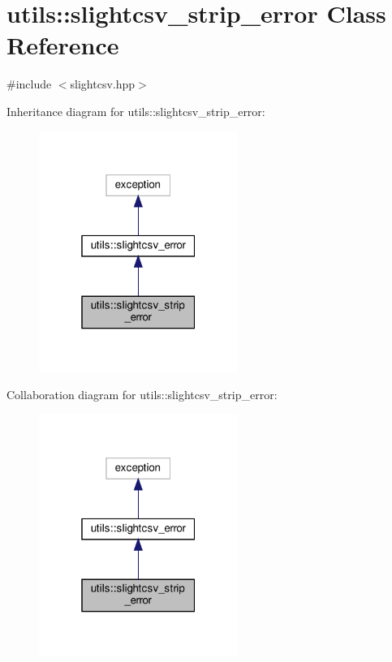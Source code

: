 \hypertarget{classutils_1_1slightcsv__strip__error}{}\section{utils\+:\+:slightcsv\+\_\+strip\+\_\+error Class Reference}
\label{classutils_1_1slightcsv__strip__error}


{\ttfamily \#include $<$slightcsv.\+hpp$>$}



Inheritance diagram for utils\+:\+:slightcsv\+\_\+strip\+\_\+error\+:
\nopagebreak
\begin{figure}[H]
\begin{center}
\leavevmode
\includegraphics[width=184pt]{classutils_1_1slightcsv__strip__error__inherit__graph}
\end{center}
\end{figure}


Collaboration diagram for utils\+:\+:slightcsv\+\_\+strip\+\_\+error\+:
\nopagebreak
\begin{figure}[H]
\begin{center}
\leavevmode
\includegraphics[width=184pt]{classutils_1_1slightcsv__strip__error__coll__graph}
\end{center}
\end{figure}


